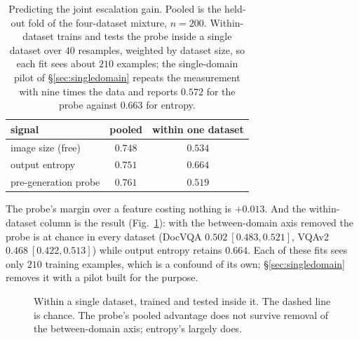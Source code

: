 \documentclass[10pt,twocolumn]{article}
\theoremstyle{plain}
\begin{document}
\begin{table}[t]
\centering\small
\setlength{\tabcolsep}{4pt}
\begin{tabular}{lcc}
\toprule
signal & pooled & within one dataset \\
\midrule
image size (free) & $0.748$ & $0.534$ \\
output entropy    & $0.751$ & $\mathbf{0.664}$ \\
pre-generation probe & $\mathbf{0.761}$ & $0.519$ \\
\bottomrule
\end{tabular}
\caption{Predicting the joint escalation gain. Pooled is the held-out fold of
the four-dataset mixture, $n=200$. Within-dataset trains and tests the probe
inside a single dataset over $40$ resamples, weighted by dataset size, so each
fit sees about $210$ examples; the single-domain pilot of
\S\ref{sec:singledomain} repeats the measurement with nine times the data and
reports $0.572$ for the probe against $0.663$ for entropy.}
\label{tab:confound}
\end{table}

The probe's margin over a feature costing nothing is $+0.013$. And the
within-dataset column is the result (Fig.~\ref{fig:confound}): with the
between-domain axis removed the probe is at chance in every dataset (DocVQA
$0.502\ [0.483, 0.521]$, VQAv2 $0.468\ [0.422, 0.513]$) while output entropy
retains $0.664$. Each of these fits sees only $210$ training examples, which is
a confound of its own; \S\ref{sec:singledomain} removes it with a pilot built
for the purpose.

\begin{figure}[t]
\centering
{}
\caption{Within a single dataset, trained and tested inside it. The dashed line
is chance. The probe's pooled advantage does not survive removal of the
between-domain axis; entropy's largely does.}
\label{fig:confound}
\end{figure}
\end{document}
